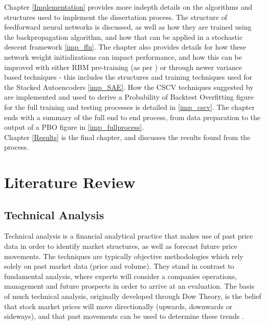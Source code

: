 \documentclass[a4paper,11pt,oneside]{article}
\theoremstyle{plain}
\theoremstyle{definition}
\begin{document}
Chapter \ref{Implementation} provides more indepth details on the algorithms and structures used to implement the dissertation process. The structure of feedforward neural networks is discussed, as well as how they are trained using the backpropagation algorithm, and how that can be applied in a stochastic descent framework \ref{imp_ffn}. The chapter also provides details for how these network weight initializations can impact performance, and how this can be improved with either RBM pre-training (as per \cite{Hinton2}) or through newer variance based techniques  - this includes the structures and training techniques used for the Stacked Autoencoders \ref{imp_SAE}. How the CSCV techniques suggested by \cite{BailyPBO} are implemented and used to derive a Probability of Backtest Overfitting figure for the full training and testing processes is detailed in \ref{imp_cscv}. The chapter ends with a summary of the full end to end process, from data preparation to the output of a PBO figure in \ref{imp_fullprocess}.
~\\\newline
Chapter \ref{Results} is the final chapter, and discusses the results found from the process. 
\newpage
\section{Literature Review}\label{lr_LiteratureReview}
\subsection{Technical Analysis}\label{lr_TechnicalAnalysis}

Technical analysis is a financial analytical practice that makes use of past price data in order to identify market 
structures, as well as forecast future price movements. The techniques are typically objective methodologies 
which rely solely on past market data (price and volume). They stand in contrast to fundamental analysis, where 
experts will consider a companies operations, management and future prospects in order to arrive at an evaluation. 
The basis of much technical analysis, originally developed through Dow Theory, is the belief that stock market 
prices will move directionally (upwards, downwards or sideways), and that past movements can be used to 
determine these trends  \cite {Murphy}.
\hfill \break 
\end{document}
